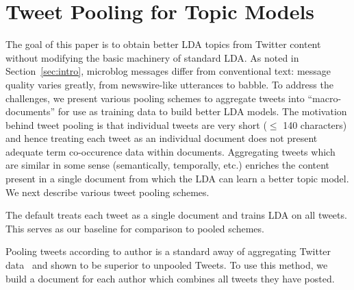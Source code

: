 \documentclass{sig-alternate}
\newcommand{\secmoveup}{\vspace{-1.mm}}
\begin{document}

\secmoveup
\section{Tweet Pooling for Topic Models}

\label{sec:pooling}

The goal of this paper is to obtain better LDA topics from Twitter
content without modifying the basic machinery of standard LDA.  As
noted in Section~\ref{sec:intro}, microblog messages differ from
conventional text: message quality varies greatly, from newswire-like
utterances to babble.  To address the challenges, we present various
pooling schemes to aggregate tweets into ``macro-documents'' for use
as training data to build better LDA models.  The motivation behind
tweet pooling is that individual tweets are very short ($\leq$ 140
characters) and hence treating each tweet as an individual document
does not present adequate term co-occurence data within documents.
Aggregating tweets which are similar in some sense (semantically,
temporally, etc.) enriches the content present in a single document
from which the LDA can learn a better topic model.  We next describe
various tweet pooling schemes.

\vspace{1mm} The default treats
each tweet as a single document and trains LDA on all tweets. This
serves as our baseline for comparison to pooled schemes.

\vspace{1mm} Pooling tweets according to
author is a standard away of aggregating Twitter
data~\cite{Weng2010wsdm,hong} and shown to be superior to unpooled
Tweets.  To use this method, we build a document for each author which
combines all tweets they have posted.
\end{document}
